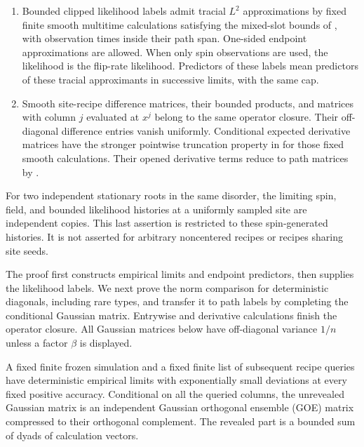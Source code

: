 \begin{theorem}
\begin{enumerate}[label=(\roman*)]
\begin{equation}
 \qquad \max_{i\ne j}|Q_{ij}|\longrightarrow0.
 \label{eq:path-entry-prediction}
\end{equation}
For two bounded path matrices,
\begin{equation}
 Q\circ R=D_{\Delta(Q)\Delta(R)}+V+o_{\op}(1),
 \label{eq:path-hadamard}
\end{equation}
where $V$ is in the operator-norm closure of bounded visible dyads.
\item Bounded clipped likelihood labels admit tracial $L^2$
approximations by fixed finite smooth multitime calculations satisfying
the mixed-slot bounds of , with observation
times inside their path span.  One-sided endpoint
approximations are allowed.  When only spin observations are used,
the likelihood is the flip-rate likelihood.  Predictors of these
labels mean predictors of these tracial approximants in successive
limits, with the same cap.
\item Smooth site-recipe difference matrices, their bounded products,
and matrices with column $j$ evaluated at $x^j$ belong to the same
operator closure.  Their off-diagonal difference entries vanish
uniformly.  Conditional expected derivative matrices have the stronger
pointwise truncation property in 
for those fixed smooth calculations.  Their opened derivative terms
reduce to path matrices by .
\end{enumerate}
For two independent stationary roots in the same disorder, the limiting
spin, field, and bounded likelihood histories at a uniformly sampled
site are independent copies.  This last assertion is restricted to
these spin-generated histories.  It is not asserted for arbitrary
noncentered recipes or recipes sharing site seeds.
\end{theorem}

The proof first constructs empirical limits and endpoint predictors,
then supplies the likelihood labels.  We next prove the norm comparison
for deterministic diagonals, including rare types, and transfer it to
path labels by completing the conditional Gaussian matrix.  Entrywise
and derivative calculations finish the operator closure.  All Gaussian
matrices below have off-diagonal variance $1/n$ unless a factor
$\beta$ is displayed.

\begin{lemma}
\label{lem:path-regression}
A fixed finite frozen simulation and a fixed finite list of subsequent
recipe queries have deterministic empirical limits with exponentially
small deviations at every fixed positive accuracy.  Conditional on
all the queried columns, the unrevealed Gaussian matrix is an
independent Gaussian orthogonal ensemble (GOE) matrix compressed to
their orthogonal complement.  The
revealed part is a bounded sum of dyads of calculation vectors.
\end{lemma}

